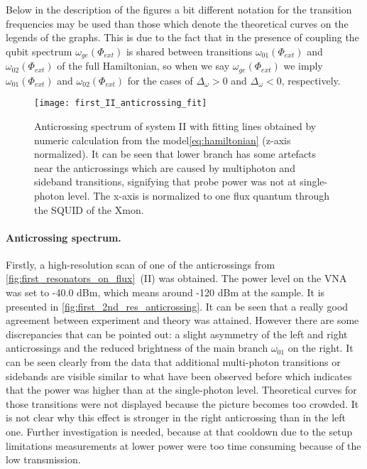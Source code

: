 \documentclass[12pt, twoside]{report}
\numberwithin{equation}{section}
\begin{document}
Below in the description of the figures a bit different notation for the transition frequencies may be used than those which denote the theoretical curves on the legends of the graphs. This is due to the fact that in the presence of coupling the qubit spectrum $\omega_{ge}(\Phi_{ext})$ is shared between transitions $\omega_{01}(\Phi_{ext})$ and $\omega_{02}(\Phi_{ext})$ of the full Hamiltonian, so when we say $\omega_{ge}(\Phi_{ext})$ we imply $\omega_{01}(\Phi_{ext})$ and $\omega_{02}(\Phi_{ext})$ for the cases of $\Delta_\omega > 0 $ and $\Delta_\omega < 0$, respectively.

\begin{figure}
\centering
\texttt{[image: first\_II\_anticrossing\_fit]}
\caption{Anticrossing spectrum of system II with fitting lines obtained by numeric calculation from the model\eqref{eq:hamiltonian} (z-axis normalized). It can be seen that lower branch has some artefacts near the anticrossings which are caused by multiphoton and sideband transitions, signifying that probe power was not at single-photon level. The x-axis is normalized to one flux quantum through the SQUID of the Xmon.}
\label{fig:first_2nd_res_anticrossing}
\end{figure} 

\paragraph{Anticrossing spectrum.} Firstly, a high-resolution scan of one of the anticrossings from \autoref{fig:first_resonators_on_flux}~(II) was obtained. The power level on the VNA was set to -40.0 dBm, which means around -120 dBm at the sample. It is presented in \autoref{fig:first_2nd_res_anticrossing}. It can be seen that a really good agreement between experiment and theory was attained. However there are some discrepancies that can be pointed out: a slight asymmetry of the left and right anticrossings and the reduced brightness of the main branch $\omega_{01}$ on the right. It can be seen clearly from the data that additional multi-photon transitions or sidebands are visible similar to what have been observed before\cite{bishop2009} which indicates that the power was higher than at the single-photon level. Theoretical curves for those transitions were not displayed because the picture becomes too crowded. It is not clear why this effect is stronger in the right anticrossing than in the left one. Further investigation is needed, because at that cooldown due to the setup limitations measurements at lower power were too time consuming because of the low transmission.
\end{document}
